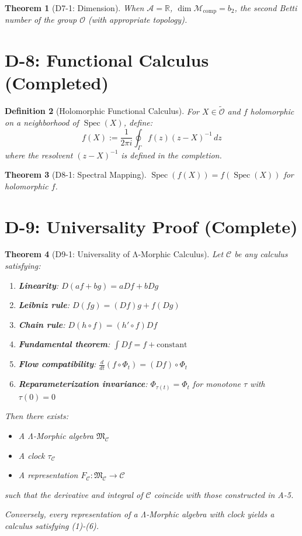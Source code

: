 \documentclass[12pt, oneside]{article}
\newtheorem{theorem}{Theorem}[section]
\newtheorem{definition}[theorem]{Definition}
\DeclareMathOperator{\Spec}{Spec}
\newcommand{\A}{\mathcal{A}}
\newcommand{\Opr}{\mathcal{O}}
\newcommand{\wtilde}{\widetilde}
\newcommand{\mf}[1]{\mathfrak{#1}}
\begin{document}
\begin{theorem}[D7-1: Dimension]
When $\A = \mathbb{R}$, $\dim \mathcal{M}_{\text{comp}} = b_2$, the second Betti number of the group $\Opr$ (with appropriate topology).
\end{theorem}

\section{D-8: Functional Calculus (Completed)}

\begin{definition}[Holomorphic Functional Calculus]
For $X \in \wtilde{\Opr}$ and $f$ holomorphic on a neighborhood of $\Spec(X)$, define:
\begin{equation}
f(X) := \frac{1}{2\pi i} \oint_\Gamma f(z) (z - X)^{-1} \, dz
\end{equation}
where the resolvent $(z - X)^{-1}$ is defined in the completion.
\end{definition}

\begin{theorem}[D8-1: Spectral Mapping]
$\Spec(f(X)) = f(\Spec(X))$ for holomorphic $f$.
\end{theorem}

\section{D-9: Universality Proof (Complete)}

\begin{theorem}[D9-1: Universality of Λ-Morphic Calculus]
Let $\mathcal{C}$ be any calculus satisfying:
\begin{enumerate}
    \item \textbf{Linearity}: $D(af + bg) = aDf + bDg$
    \item \textbf{Leibniz rule}: $D(fg) = (Df)g + f(Dg)$
    \item \textbf{Chain rule}: $D(h \circ f) = (h' \circ f)Df$
    \item \textbf{Fundamental theorem}: $\int Df = f + \text{constant}$
    \item \textbf{Flow compatibility}: $\frac{d}{dt}(f \circ \Phi_t) = (Df) \circ \Phi_t$
    \item \textbf{Reparameterization invariance}: $\Phi_{\tau(t)} = \Phi_t$ for monotone $\tau$ with $\tau(0)=0$
\end{enumerate}

Then there exists:
\begin{itemize}
    \item A Λ-Morphic algebra $\mf{M}_{\mathcal{C}}$
    \item A clock $\tau_{\mathcal{C}}$
    \item A representation $F_{\mathcal{C}}: \mf{M}_{\mathcal{C}} \rightarrow \mathcal{C}$
\end{itemize}
such that the derivative and integral of $\mathcal{C}$ coincide with those constructed in A-5.

Conversely, every representation of a Λ-Morphic algebra with clock yields a calculus satisfying (1)-(6).
\end{theorem}
\end{document}
